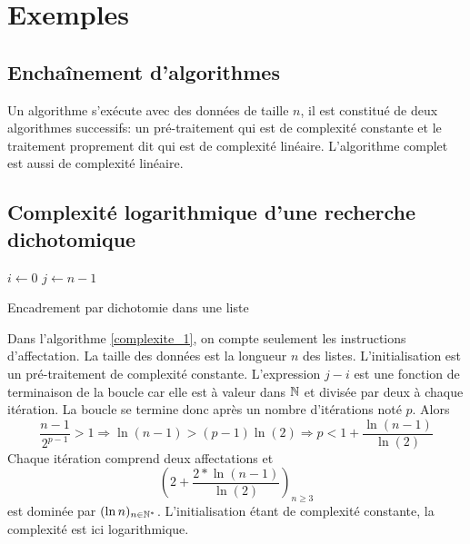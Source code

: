 \section{Exemples}
\subsection{Enchaînement d'algorithmes}
Un algorithme s'exécute avec des données de taille $n$, il est constitué de deux algorithmes successifs: un pré-traitement qui est de complexité constante et le traitement proprement dit qui est de complexité linéaire. L'algorithme complet est aussi de complexité linéaire.

\subsection{Complexité logarithmique d'une recherche dichotomique}
\begin{algorithm}
  $i\leftarrow 0$\;
  $j\leftarrow n-1$\;
  \caption{Encadrement par dichotomie dans une liste}
  \label{complexite_1}
\end{algorithm}
Dans l'algorithme \ref{complexite_1}, on compte seulement les instructions d'affectation. La taille des données est la longueur $n$ des listes.\newline
L'initialisation est un pré-traitement de complexité constante.\newline
L'expression $j-i$ est une fonction de terminaison de la boucle car elle est à valeur dans $\mathbb{N}$ et divisée par deux à chaque itération. La boucle se termine donc après un nombre d'itérations noté $p$. Alors
\begin{displaymath}
  \frac{n-1}{2^{p-1}} > 1
\Rightarrow \ln(n-1) > (p-1) \ln(2)  
\Rightarrow p < 1 + \frac{\ln(n-1)}{\ln(2)}
\end{displaymath}
Chaque itération comprend deux affectations et 
\begin{displaymath}
  \left( 2 + \frac{2*\ln(n-1)}{\ln(2)}\right)_{n\geq 3} 
\end{displaymath}
est dominée par $(\ln n)_{n\in \mathbb{N}^*}$. L'initialisation étant de complexité constante, la complexité est ici logarithmique.

